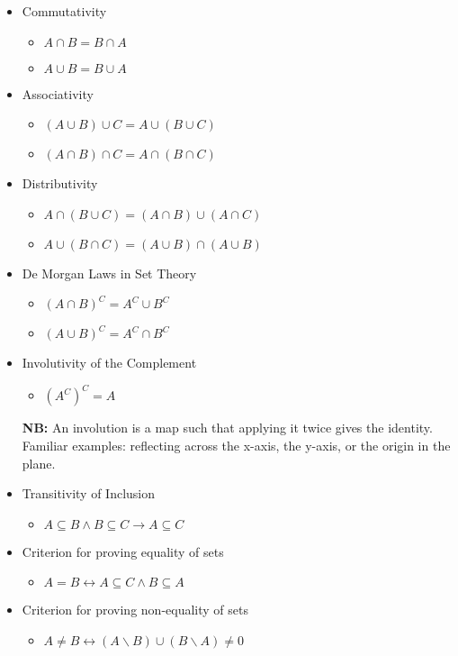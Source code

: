 \documentclass[10pt]{article}
\begin{document}
	\begin{itemize}
		\item Commutativity
		\begin{itemize}
			\item $A \cap B = B \cap A$
			\item $A \cup B = B \cup A$
		\end{itemize}
		\item Associativity
		\begin{itemize}
			\item $(A \cup B) \cup C = A \cup (B \cup C)$
			\item $(A \cap B) \cap C = A \cap (B \cap C)$
		\end{itemize}
		\item Distributivity
		\begin{itemize}
			\item $A \cap (B \cup C) = (A \cap B) \cup (A \cap C)$
			\item $A \cup (B \cap C) = (A \cup B) \cap (A \cup B)$
		\end{itemize}
		\item De Morgan Laws in Set Theory
		\begin{itemize}
			\item $(A \cap B)^C = A^C \cup B^C$
			\item $(A \cup B)^C = A^C \cap B^C$
		\end{itemize}
		\item Involutivity of the Complement
		\begin{itemize}
			\item $(A^C)^C = A$
		\end{itemize}
		\item[\textbf{NB:}] An involution is a map such that applying it twice gives the identity. Familiar examples: reflecting across the x-axis, the y-axis, or the origin in the plane.
		\item Transitivity of Inclusion
		\begin{itemize}
			\item $A \subseteq B \land B \subseteq C \rightarrow A \subseteq C$
		\end{itemize}
		\item Criterion for proving equality of sets
		\begin{itemize}
			\item $A=B \leftrightarrow A \subseteq C \land B \subseteq A$
		\end{itemize}
		\item Criterion for proving non-equality of sets
		\begin{itemize}
			\item $A \neq B \leftrightarrow (A \backslash B) \cup (B \backslash A) \neq 0$
		\end{itemize}
	\end{itemize}
	
\end{document}
